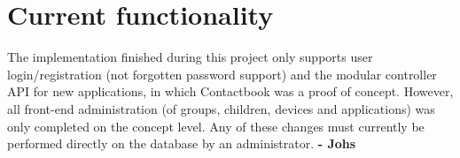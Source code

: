\section{Current functionality}

The implementation finished during this project only supports user login/registration (not forgotten password support) and the modular controller API for new applications, in which Contactbook was a proof of concept. However, all front-end administration (of groups, children, devices and applications) was only completed on the concept level. Any of these changes must currently be performed directly on the database by an administrator. \textbf{- Johs}
